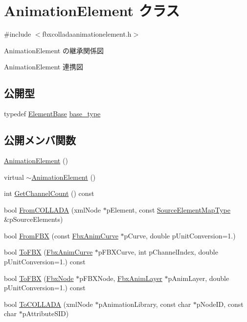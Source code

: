 \hypertarget{class_animation_element}{}\section{Animation\+Element クラス}
\label{class_animation_element}


{\ttfamily \#include $<$fbxcolladaanimationelement.\+h$>$}



Animation\+Element の継承関係図


Animation\+Element 連携図
\subsection*{公開型}
\begin{DoxyCompactItemize}
\item 
typedef \hyperlink{class_element_base}{Element\+Base} \hyperlink{class_animation_element_aaf3cccce84fd90fe8e08b1a45a5fc8a2}{base\+\_\+type}
\end{DoxyCompactItemize}
\subsection*{公開メンバ関数}
\begin{DoxyCompactItemize}
\item 
\hyperlink{class_animation_element_a1c52f1799ec9f0a64270aa0602bc036c}{Animation\+Element} ()
\item 
virtual \hyperlink{class_animation_element_ad8f5739e70502e9abaa7bc9e0c1384d2}{$\sim$\+Animation\+Element} ()
\item 
int \hyperlink{class_animation_element_a2c02d9a40137240eea5c3bc867c59fa3}{Get\+Channel\+Count} () const
\item 
bool \hyperlink{class_animation_element_ad0a36ae16945ef4a3027bb8f57452c45}{From\+C\+O\+L\+L\+A\+DA} (xml\+Node $\ast$p\+Element, const \hyperlink{fbxcolladautils_8h_a43e0f8079e4c5df7b8b0496de1f120c3}{Source\+Element\+Map\+Type} \&p\+Source\+Elements)
\item 
bool \hyperlink{class_animation_element_a44a774ba612fb2707dee931048231686}{From\+F\+BX} (const \hyperlink{class_fbx_anim_curve}{Fbx\+Anim\+Curve} $\ast$p\+Curve, double p\+Unit\+Conversion=1.)
\item 
bool \hyperlink{class_animation_element_af26601574516e4a3d05a5e8a611b6ea5}{To\+F\+BX} (\hyperlink{class_fbx_anim_curve}{Fbx\+Anim\+Curve} $\ast$p\+F\+B\+X\+Curve, int p\+Channel\+Index, double p\+Unit\+Conversion=1.) const
\item 
bool \hyperlink{class_animation_element_a97828e118006d28ad27aae3d3a668b66}{To\+F\+BX} (\hyperlink{class_fbx_node}{Fbx\+Node} $\ast$p\+F\+B\+X\+Node, \hyperlink{class_fbx_anim_layer}{Fbx\+Anim\+Layer} $\ast$p\+Anim\+Layer, double p\+Unit\+Conversion=1.) const
\item 
bool \hyperlink{class_animation_element_ac697ab978aa85e18c65eaf651db69c6a}{To\+C\+O\+L\+L\+A\+DA} (xml\+Node $\ast$p\+Animation\+Library, const char $\ast$p\+Node\+ID, const char $\ast$p\+Attribute\+S\+ID)
\end{DoxyCompactItemize}
